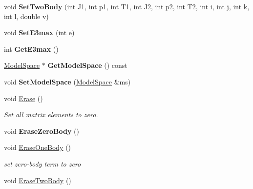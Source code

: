 \begin{DoxyCompactItemize}
\item 
\hypertarget{classOperator_a04d1aa8242f17370f5827aad6b3f6ddb}{void {\bfseries Set\-Two\-Body} (int J1, int p1, int T1, int J2, int p2, int T2, int i, int j, int k, int l, double v)}\label{classOperator_a04d1aa8242f17370f5827aad6b3f6ddb}

\item 
\hypertarget{classOperator_a8b32ed75e5e0d6175a2f2f517c63a89c}{void {\bfseries Set\-E3max} (int e)}\label{classOperator_a8b32ed75e5e0d6175a2f2f517c63a89c}

\item 
\hypertarget{classOperator_a42d67df774701e40e2c49e539a68c937}{int {\bfseries Get\-E3max} ()}\label{classOperator_a42d67df774701e40e2c49e539a68c937}

\item 
\hypertarget{classOperator_a6f683fcbac22a4056be2422591a9e43b}{\hyperlink{classModelSpace}{Model\-Space} $\ast$ {\bfseries Get\-Model\-Space} () const }\label{classOperator_a6f683fcbac22a4056be2422591a9e43b}

\item 
\hypertarget{classOperator_ade09f5e47031f285f10d7f4f8a5e0216}{void {\bfseries Set\-Model\-Space} (\hyperlink{classModelSpace}{Model\-Space} \&ms)}\label{classOperator_ade09f5e47031f285f10d7f4f8a5e0216}

\item 
\hypertarget{classOperator_a8a0f7d6aa5163929850d06b31dc24a55}{void \hyperlink{classOperator_a8a0f7d6aa5163929850d06b31dc24a55}{Erase} ()}\label{classOperator_a8a0f7d6aa5163929850d06b31dc24a55}

\begin{DoxyCompactList}\small\item\em Set all matrix elements to zero. \end{DoxyCompactList}\item 
\hypertarget{classOperator_aee08b8c721271c700f325e02ba7b47d1}{void {\bfseries Erase\-Zero\-Body} ()}\label{classOperator_aee08b8c721271c700f325e02ba7b47d1}

\item 
void \hyperlink{classOperator_ab26470d0c88d61699443223675e57bbe}{Erase\-One\-Body} ()
\begin{DoxyCompactList}\small\item\em set zero-\/body term to zero \end{DoxyCompactList}\item 
\hypertarget{classOperator_a5c49da3f408b79a7430af4e3ec1ff8df}{void \hyperlink{classOperator_a5c49da3f408b79a7430af4e3ec1ff8df}{Erase\-Two\-Body} ()}\label{classOperator_a5c49da3f408b79a7430af4e3ec1ff8df}


\end{DoxyCompactItemize}
